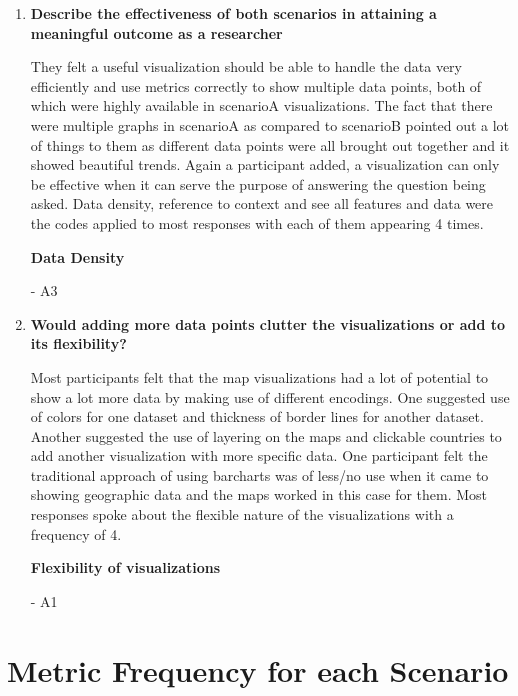 \documentclass[seploa]{beavtex}
\begin{document}
\begin{enumerate}
\item \textbf{Describe the effectiveness of both scenarios in attaining a meaningful outcome as a researcher}

They felt a useful visualization should be able to handle the data very efficiently and use metrics correctly to show multiple data points, both of which were highly available in scenarioA visualizations. The fact that there were multiple graphs in scenarioA as compared to scenarioB pointed out a lot of things to them as different data points were all brought out together and it showed beautiful trends. Again a participant added, a visualization can only be effective when it can serve the purpose of answering the question being asked. Data density, reference to context and see all features and data were the codes applied to most responses with each of them appearing 4 times.

\textbf{Data Density}

{\em {}} - A3

\item \textbf{Would adding more data points clutter the visualizations or add to its flexibility?}

Most participants felt that the map visualizations had a lot of potential to show a lot more data by making use of different encodings. One suggested use of colors for one dataset and thickness of border lines for another dataset. Another suggested the use of layering on the maps and clickable countries to add another visualization with more specific data. One participant felt the traditional approach of using barcharts was of less/no use when it came to showing geographic data and the maps worked in this case for them. Most responses spoke about the flexible nature of the visualizations with a frequency of 4.

\textbf{Flexibility of visualizations}

{\em {}} - A1
\end{enumerate}
\section{Metric Frequency for each Scenario}
\end{document}

